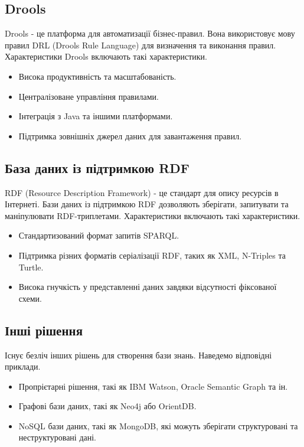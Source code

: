 \documentclass[12pt, a4paper]{article}
\begin{document}
\subsection{Drools}

Drools - це платформа для автоматизації бізнес-правил. Вона використовує мову правил DRL (Drools Rule Language) для визначення та виконання правил. Характеристики Drools включають такі характеристики.

\begin{itemize}
    \item Висока продуктивність та масштабованість.
    \item Централізоване управління правилами.
    \item Інтеграція з Java та іншими платформами.
    \item Підтримка зовнішніх джерел даних для завантаження правил.
\end{itemize}

\subsection{База даних із підтримкою RDF}

RDF (Resource Description Framework) - це стандарт для опису ресурсів в Інтернеті. Бази даних із підтримкою RDF дозволяють зберігати, запитувати та маніпулювати RDF-триплетами. Характеристики включають такі характеристики.

\begin{itemize}
    \item Стандартизований формат запитів SPARQL.
    \item Підтримка різних форматів серіалізації RDF, таких як XML, N-Triples та Turtle.
    \item Висока гнучкість у представленні даних завдяки відсутності фіксованої схеми.
\end{itemize}

\subsection{Інші рішення}

Існує безліч інших рішень для створення бази знань. Наведемо відповідні приклади.

\begin{itemize}
    \item Пропрієтарні рішення, такі як IBM Watson, Oracle Semantic Graph та ін.
    \item Графові бази даних, такі як Neo4j або OrientDB.
    \item NoSQL бази даних, такі як MongoDB, які можуть зберігати структуровані та неструктуровані дані.
\end{itemize}
\end{document}
